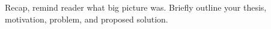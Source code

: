 
Recap, remind reader what big picture was.
Briefly outline your thesis, motivation, problem, and proposed solution.



